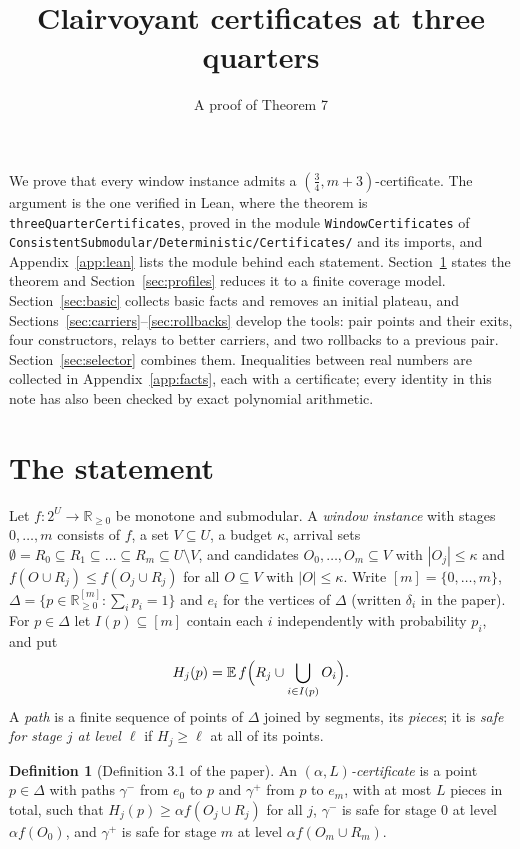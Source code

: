 \documentclass[11pt,a4paper]{article}
\title{Clairvoyant certificates at three quarters}
\author{A proof of Theorem 7}
\date{}
\numberwithin{equation}{section}
\theoremstyle{definition}
\newtheorem{definition}[theorem]{Definition}
\begin{document}
\maketitle

\noindent
We prove that every window instance admits a $(\frac34,m+3)$-certificate. The
argument is the one verified in Lean, where the theorem is
\texttt{threeQuarterCertificates}, proved in the module \texttt{WindowCertificates} of
\nolinkurl{ConsistentSubmodular/Deterministic/Certificates/} and its imports, and
Appendix~\ref{app:lean} lists the module behind each statement.
Section~\ref{sec:statement} states the theorem and Section~\ref{sec:profiles}
reduces it to a finite coverage model. Section~\ref{sec:basic} collects basic
facts and removes an initial plateau, and
Sections~\ref{sec:carriers}--\ref{sec:rollbacks} develop the tools: pair points and their exits, four constructors, relays to
better carriers, and two rollbacks to a previous pair. Section~\ref{sec:selector}
combines them. Inequalities between real numbers are collected in
Appendix~\ref{app:facts}, each with a certificate; every identity in this note
has also been checked by exact polynomial arithmetic.

\section{The statement}\label{sec:statement}

Let $f\colon2^U\to\mathbb R_{\ge0}$ be monotone and submodular. A \emph{window
instance} with stages $0,\dots,m$ consists of $f$, a set $V\subseteq U$, a
budget $\kappa$, arrival sets $\emptyset=R_0\subseteq R_1\subseteq\dots\subseteq
R_m\subseteq U\setminus V$, and candidates $O_0,\dots,O_m\subseteq V$ with
$|O_j|\le\kappa$ and $f(O\cup R_j)\le f(O_j\cup R_j)$ for all $O\subseteq V$ with
$|O|\le\kappa$. Write $[m]=\{0,\dots,m\}$,
$\Delta=\{p\in\mathbb R^{[m]}_{\ge0}:\sum_ip_i=1\}$ and $e_i$ for the vertices of
$\Delta$ (written $\delta_i$ in the paper). For $p\in\Delta$ let $I(p)\subseteq[m]$
contain each $i$ independently with probability $p_i$, and put
\[
H_j(p)=\mathbb E\,f\Bigl(R_j\cup\bigcup_{i\in I(p)}O_i\Bigr).
\]
A \emph{path} is a finite sequence of points of $\Delta$ joined by segments, its
\emph{pieces}; it is \emph{safe for stage $j$ at level $\ell$} if $H_j\ge\ell$ at
all of its points.

\begin{definition}[Definition 3.1 of the paper]
An \emph{$(\alpha,L)$-certificate} is a point $p\in\Delta$ with paths $\gamma^-$
from $e_0$ to $p$ and $\gamma^+$ from $p$ to $e_m$, with at most $L$ pieces in
total, such that $H_j(p)\ge\alpha f(O_j\cup R_j)$ for all $j$, $\gamma^-$ is safe
for stage $0$ at level $\alpha f(O_0)$, and $\gamma^+$ is safe for stage $m$ at
level $\alpha f(O_m\cup R_m)$.
\end{definition}
\end{document}
